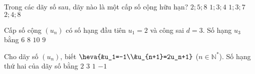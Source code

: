 \begin{ex}%
	Trong các dãy số sau, dãy nào là một cấp số cộng hữu hạn?
	\choice
	{\True $2;5;8$}
	{$1;3;4$}
	{$1;3;7$}
	{$2;4;8$}
\end{ex}

\begin{ex}%
	Cấp số cộng $(u_n)$ có số hạng đầu tiên $u_1=2$ và công sai $d=3$. Số hạng $u_3$ bằng
	\choice
	{$6$}
	{\True $8$}
	{$10$}
	{$9$}
\end{ex}
\begin{ex}%
	Cho dãy số $(u_n)$, biết $\heva{&u_1=-1\\&u_{n+1}=2u_n+1}$ ($n\in\mathbb{N}^{*}$). Số hạng thứ hai của dãy số bằng
	\choice
	{$2$}
	{$3$}
	{$1$}
	{\True $-1$}
\end{ex}

